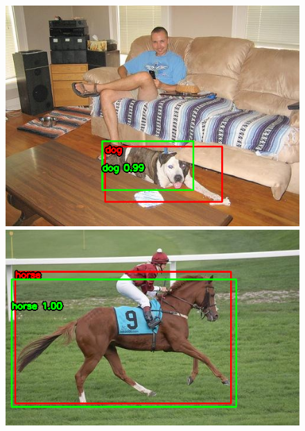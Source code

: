 \documentclass{article}
\begin{document}
\begin{figure}[htbp]
\begin{minipage}{0.24\textwidth}
      \includegraphics[width=\linewidth]{results_lg/dog_0.png}
  \end{minipage}
  \begin{minipage}{0.24\textwidth}
      \centering
      \includegraphics[width=\linewidth]{results_lg/horse_1.png}
  \end{minipage}
  

\end{figure}
\end{document}
